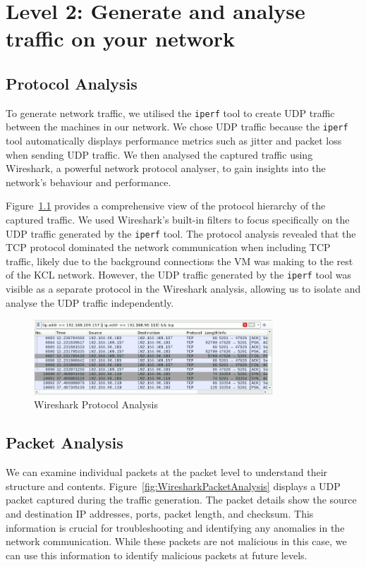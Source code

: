 \chapter{Level 2: Generate and analyse traffic on your network}

\section{Protocol Analysis}

To generate network traffic, we utilised the \texttt{iperf} tool to create UDP traffic between the machines in our network. We chose UDP traffic because the \texttt{iperf} tool automatically displays performance metrics such as jitter and packet loss when sending UDP traffic. We then analysed the captured traffic using Wireshark, a powerful network protocol analyser, to gain insights into the network's behaviour and performance.

Figure~\ref{fig:WiresharkProtocolAnalysis} provides a comprehensive view of the protocol hierarchy of the captured traffic. We used Wireshark's built-in filters to focus specifically on the UDP traffic generated by the \texttt{iperf} tool. The protocol analysis revealed that the TCP protocol dominated the network communication when including TCP traffic, likely due to the background connections the VM was making to the rest of the KCL network. However, the UDP traffic generated by the \texttt{iperf} tool was visible as a separate protocol in the Wireshark analysis, allowing us to isolate and analyse the UDP traffic independently.

\begin{figure}[H]
\centering
\includegraphics[width=0.8\textwidth]{img/level2/level2-server-protocol-analysis.png}
\caption{Wireshark Protocol Analysis}\label{fig:WiresharkProtocolAnalysis}
\end{figure}

\section{Packet Analysis}

We can examine individual packets at the packet level to understand their structure and contents. Figure~\ref{fig:WiresharkPacketAnalysis} displays a UDP packet captured during the traffic generation. The packet details show the source and destination IP addresses, ports, packet length, and checksum. This information is crucial for troubleshooting and identifying any anomalies in the network communication. While these packets are not malicious in this case, we can use this information to identify malicious packets at future levels.

